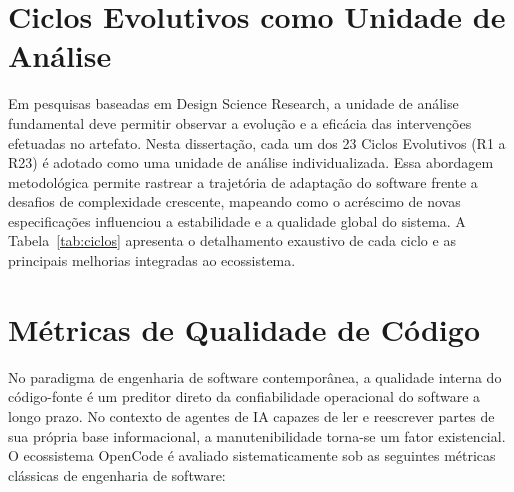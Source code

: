 \documentclass[12pt,a4paper,oneside]{abntex2}
\begin{document}
\section{Ciclos Evolutivos como Unidade de Análise}

Em pesquisas baseadas em Design Science Research, a unidade de análise fundamental deve permitir observar a evolução e a eficácia das intervenções efetuadas no artefato. Nesta dissertação, cada um dos 23 Ciclos Evolutivos (R1 a R23) é adotado como uma unidade de análise individualizada. Essa abordagem metodológica permite rastrear a trajetória de adaptação do software frente a desafios de complexidade crescente, mapeando como o acréscimo de novas especificações influenciou a estabilidade e a qualidade global do sistema. A Tabela~\ref{tab:ciclos} apresenta o detalhamento exaustivo de cada ciclo e as principais melhorias integradas ao ecossistema.

\section{Métricas de Qualidade de Código}

No paradigma de engenharia de software contemporânea, a qualidade interna do código-fonte é um preditor direto da confiabilidade operacional do software a longo prazo. No contexto de agentes de IA capazes de ler e reescrever partes de sua própria base informacional, a manutenibilidade torna-se um fator existencial. O ecossistema OpenCode é avaliado sistematicamente sob as seguintes métricas clássicas de engenharia de software:
\end{document}
